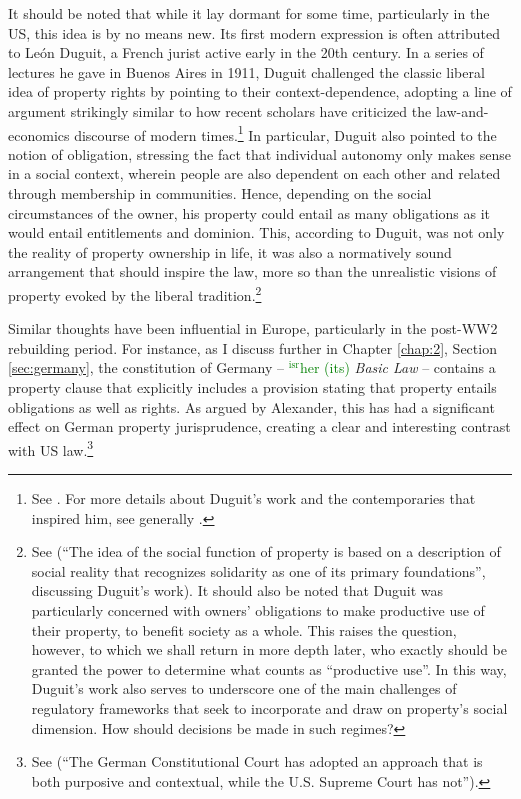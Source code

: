 \documentclass[12pt,a4paper]{book} %
\newcommand{\isr}[1]{\textcolor{green}{$^{\textrm{isr}}${#1}}}
\begin{document}
It should be noted that while it lay dormant for some time, particularly in the US, this idea is by no means new. Its first modern expression is often attributed to Le{\'o}n Duguit, a French jurist active early in the 20th century. In a series of lectures he gave in Buenos Aires in 1911, Duguit challenged the classic liberal idea of property rights by pointing to their context-dependence, adopting a line of argument strikingly similar to how recent scholars have criticized the law-and-economics discourse of modern times.\footnote{See \cite[1004-1008]{foster11}. For more details about Duguit's work and the contemporaries that inspired him, see generally \cite{mirow10}.} In particular, Duguit also pointed to the notion of obligation, stressing the fact that individual autonomy only makes sense in a social context, wherein people are also dependent on each other and related through membership in communities. Hence, depending on the social circumstances of the owner, his property could entail as many obligations as it would entail entitlements and dominion. This, according to Duguit, was not only the reality of property ownership in life, it was also a normatively sound arrangement that should inspire the law, more so than the unrealistic visions of property evoked by the liberal tradition.\footnote{See \cite[1005]{foster11} (``The idea of the social function of property is based on a description of social reality that recognizes solidarity as one of its primary foundations'', discussing Duguit's work). It should also be noted that Duguit was particularly concerned with owners' obligations to make productive use of their property, to benefit society as a whole. This raises the question, however, to which we shall return in more depth later, who exactly should be granted the power to determine what counts as ``productive use''. In this way, Duguit's work also serves to underscore one of the main challenges of regulatory frameworks that seek to incorporate and draw on property's social dimension. How should decisions be made in such regimes?} 

Similar thoughts have been influential in Europe, particularly in the post-WW2 rebuilding period. For instance, as I discuss further in Chapter \ref{chap:2}, Section \ref{sec:germany}, the constitution of Germany -- \isr{her (its)} {\it Basic Law} -- contains a property clause that explicitly includes a provision stating that property entails obligations as well as rights. As argued by Alexander, this has had a significant effect on German property jurisprudence, creating a clear and interesting contrast with US law.\footnote{See \cite[338]{alexander03} (``The German Constitutional Court has adopted an approach that is both purposive and contextual, while the U.S. Supreme Court has not'').} 
\end{document}
